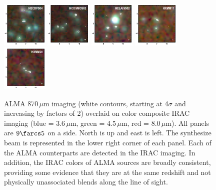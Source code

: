 \documentclass[iop]{emulateapj}
\begin{document}



\begin{figure}[!tbp] 
    \begin{centering}
\includegraphics[width=0.195\textwidth]{../Figures/HECDFS04_rgb.pdf}
\includegraphics[width=0.195\textwidth]{../Figures/HCOSMOS02_rgb.pdf}
\includegraphics[width=0.195\textwidth]{../Figures/HELAISS02_rgb.pdf}
\includegraphics[width=0.195\textwidth]{../Figures/HXMM11_rgb.pdf}
\includegraphics[width=0.195\textwidth]{../Figures/HXMM20_rgb.pdf}
\end{centering}

\caption{ ALMA 870$\,\mu$m imaging (white contours, starting at 4$\sigma$ and
increasing by factors of 2) overlaid on color composite IRAC imaging (blue =
3.6$\,\mu$m, green = 4.5$\,\mu$m, red = 8.0$\,\mu$m).  All panels are $9\farcs5$
on a side.  North is up and east is left.  The synthesize beam is represented in
the lower right corner of each panel.  Each of the ALMA counterparts are
detected in the IRAC imaging.  In addition, the IRAC colors of ALMA sources are
broadly consistent, providing some evidence that they are at the same redshift
and not physically unassociated blends along the line of
sight.}\label{fig:iraccolor}

\end{figure}
\end{document}
